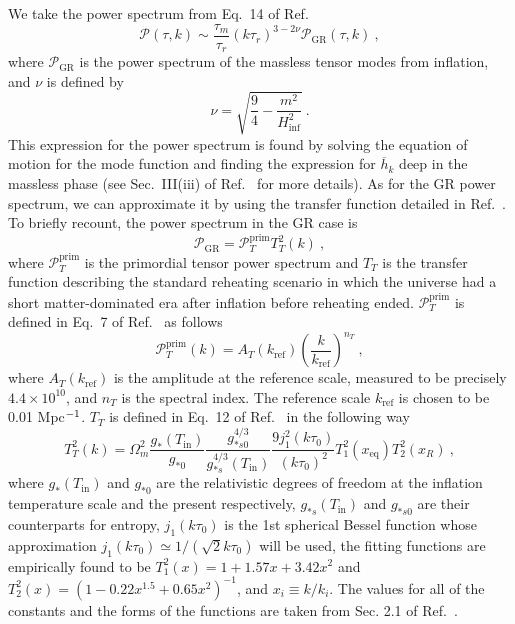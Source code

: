 \documentclass[prd,twocolumn,aps,psfig,nofootinbib,nobibnotes,superscriptaddress,preprintnumbers,times]{revtex4-2}
\begin{document}
We take the power spectrum from Eq.\ 14 of Ref.\ \cite{Fujita:2018ehq}
\begin{equation}\label{eqn:p_sfm}
    \mathcal{P}(\tau, k) \sim \frac{\tau_m}{\tau_r}(k\tau_r)^{3-2\nu}\mathcal{P}_{\text{GR}}(\tau,k)\ , 
\end{equation}
where $\mathcal{P}_{\text{GR}}$ is the power spectrum of the massless tensor modes from inflation, and $\nu$ is defined by 
\begin{equation}\label{eqn:nu}
    \nu = \sqrt{\frac{9}{4} - \frac{m^2}{H_{\inf}^2}}\ .
\end{equation}
This expression for the power spectrum is found by solving the equation of motion for the mode function and finding the expression for $\overline{h}_k$ deep in the massless phase (see Sec.\ III(iii) of Ref.\ \cite{Fujita:2018ehq} for more details). As for the GR power spectrum, we can approximate it by using the transfer function detailed in Ref.\ \cite{Kuroyanagi:2014nba}. To briefly recount, the power spectrum in the GR case is 
\begin{equation}\label{eqn:p_gr_sfm}
    \mathcal{P}_{\text{GR}} = \mathcal{P}^{\text{prim}}_{T} T^2_T(k) \ ,
\end{equation}
where $\mathcal{P}^{\text{prim}}_{T}$ is the primordial tensor power spectrum 
and $T_{T}$ is the transfer function describing the standard reheating scenario in which the universe had a short matter-dominated era after inflation before reheating ended. $\mathcal{P}^{\text{prim}}_{T}$ is defined in Eq.\ 7 of Ref.\ \cite{Kuroyanagi:2014nba} as follows
\begin{equation}\label{eqn:pt}
    \mathcal{P}_{T}^{\text{prim}}(k) = A_T(k_{\text{ref}})\left(\frac{k}{k_{\text{ref}}}\right)^{n_T} \ ,
\end{equation}
where $A_T(k_{\text{ref}})$ is the amplitude at the reference scale,
\hspace{-1em}measured to be precisely $4.4\times 10^{10}$, and $n_T$ is the spectral index. The reference scale $k_{\text{ref}}$ is chosen to be 0.01 Mpc$\/^{-1}$. $T_{T}$ is defined in Eq.\ 12 of Ref.\ \cite{Kuroyanagi:2014nba} in the following way
\begin{equation}\label{eqn:tt}
    T_T^2(k) = \Omega_m^2 \frac{g_*(T_\text{in})}{g_{*0}} \frac{g_{*s0}^{4/3}}{g_{*s}^{4/3}(T_{\text{in}})} \frac{9j_1^2(k\tau_0)}{(k\tau_0)^2}T_1^2(x_{\text{eq}}) T_2^2(x_R) \ ,
\end{equation}
where $g_{*}(T_\text{in})$ and $g_{*0}$ are the relativistic degrees of freedom at the inflation temperature scale and the present respectively, $g_{*s}(T_\text{in})$ and $g_{*s0}$ are their counterparts for entropy, $j_1(k\tau_0)$ is the 1st spherical Bessel function whose approximation $j_1(k\tau_0) \simeq 1/(\sqrt{2}k\tau_0)$ will be used, the fitting functions are empirically found to be $T_1^2(x) = 1+1.57x+3.42x^2$ and $T_2^2(x) = (1-0.22x^{1.5} + 0.65x^2)^{-1}$, and $x_i \equiv k/k_i$. The values for all of the constants and the forms of the functions are taken from Sec. 2.1 of Ref.\ \cite{Kuroyanagi:2014nba}. 
\end{document}
